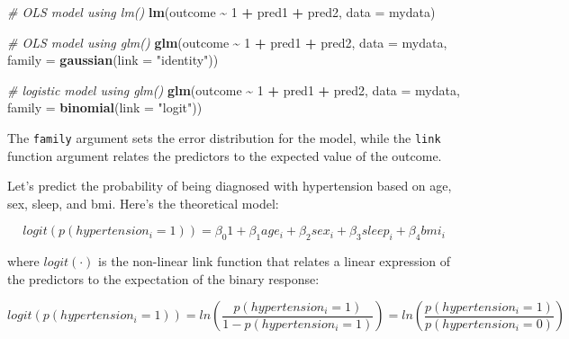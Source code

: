 \documentclass[
]{book}
\newenvironment{Shaded}{\begin{snugshade}}{\end{snugshade}}
\newcommand{\CommentTok}[1]{\textcolor[rgb]{0.56,0.35,0.01}{\textit{#1}}}
\newcommand{\DataTypeTok}[1]{\textcolor[rgb]{0.13,0.29,0.53}{#1}}
\newcommand{\DecValTok}[1]{\textcolor[rgb]{0.00,0.00,0.81}{#1}}
\newcommand{\KeywordTok}[1]{\textcolor[rgb]{0.13,0.29,0.53}{\textbf{#1}}}
\newcommand{\NormalTok}[1]{#1}
\newcommand{\OperatorTok}[1]{\textcolor[rgb]{0.81,0.36,0.00}{\textbf{#1}}}
\newcommand{\StringTok}[1]{\textcolor[rgb]{0.31,0.60,0.02}{#1}}
\begin{document}
\begin{Shaded}
\begin{Highlighting}[]
  \CommentTok{\# OLS model using lm()}
  \KeywordTok{lm}\NormalTok{(outcome }\OperatorTok{\textasciitilde{}}\StringTok{ }\DecValTok{1} \OperatorTok{+}\StringTok{ }\NormalTok{pred1 }\OperatorTok{+}\StringTok{ }\NormalTok{pred2, }
     \DataTypeTok{data =}\NormalTok{ mydata)}

  \CommentTok{\# OLS model using glm()}
  \KeywordTok{glm}\NormalTok{(outcome }\OperatorTok{\textasciitilde{}}\StringTok{ }\DecValTok{1} \OperatorTok{+}\StringTok{ }\NormalTok{pred1 }\OperatorTok{+}\StringTok{ }\NormalTok{pred2, }
      \DataTypeTok{data =}\NormalTok{ mydata, }
      \DataTypeTok{family =} \KeywordTok{gaussian}\NormalTok{(}\DataTypeTok{link =} \StringTok{"identity"}\NormalTok{))}
 
  \CommentTok{\# logistic model using glm()}
  \KeywordTok{glm}\NormalTok{(outcome }\OperatorTok{\textasciitilde{}}\StringTok{ }\DecValTok{1} \OperatorTok{+}\StringTok{ }\NormalTok{pred1 }\OperatorTok{+}\StringTok{ }\NormalTok{pred2, }
      \DataTypeTok{data =}\NormalTok{ mydata, }
      \DataTypeTok{family =} \KeywordTok{binomial}\NormalTok{(}\DataTypeTok{link =} \StringTok{"logit"}\NormalTok{))}
\end{Highlighting}
\end{Shaded}

The \texttt{family} argument sets the error distribution for the model, while the \texttt{link} function
argument relates the predictors to the expected value of the outcome.

Let's predict the probability of being diagnosed with hypertension based on age, sex, sleep, and bmi.
Here's the theoretical model:

\begin{alert}

\[
logit(p(hypertension_i = 1)) = \beta_{0}1 + \beta_1age_i + \beta_2sex_i + \beta_3sleep_i + \beta_4bmi_i 
\]

\end{alert}

where \(logit(\cdot)\) is the non-linear link function that relates a linear expression of the predictors to the expectation of the binary response:

\begin{alert}

\[
logit(p(hypertension_i = 1)) = ln \left( \frac{p(hypertension_i = 1)}{1-p(hypertension_i = 1)} \right) = ln \left( \frac{p(hypertension_i = 1)}{p(hypertension_i = 0)} \right)
\]

\end{alert}
\end{document}
